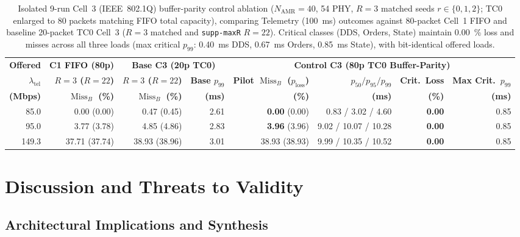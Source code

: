 \documentclass[11pt,a4paper]{article}
\newcommand{\Namr}{\ensuremath{N_{\mathrm{AMR}}}}
\newcommand{\ltel}{\ensuremath{\lambda_{\mathrm{tel}}}}
\newcommand{\MissB}{\ensuremath{\operatorname{Miss}_B}}
\newcommand{\ploss}{\ensuremath{p_{\mathrm{loss}}}}
\begin{document}
\begin{table}[!tbp]
\centering
\scriptsize
\setlength{\tabcolsep}{1.8pt}
\caption{Isolated 9-run Cell~3 (IEEE~802.1Q) buffer-parity control ablation ($\Namr=40$, \qty{54}{\mbps} PHY, $R=3$ matched seeds $r \in \{0,1,2\}$; TC0 enlarged to 80 packets matching FIFO total capacity), comparing Telemetry (\qty{100}{\milli\second}) outcomes against 80-packet Cell~1 FIFO and baseline 20-packet TC0 Cell~3 ($R=3$ matched and \texttt{supp-maxR} $R=22$). Critical classes (DDS, Orders, State) maintain \qty{0.00}{\percent} loss and misses across all three loads (max critical $p_{99}$: \qty{0.40}{\milli\second} DDS, \qty{0.67}{\milli\second} Orders, \qty{0.85}{\milli\second} State), with bit-identical offered loads.}
\label{tab:bufparity_pilot}
\begin{tabular}{@{}r r r r r r r r@{}}
\toprule
\textbf{Offered} & \textbf{C1 FIFO (80p)} & \multicolumn{2}{c}{\textbf{Base C3 (20p TC0)}} & \multicolumn{4}{c}{\textbf{Control C3 (80p TC0 Buffer-Parity)}} \\
\cmidrule(lr){3-4} \cmidrule(lr){5-8}
\textbf{$\ltel$} & \textbf{$R{=}3$ ($R{=}22$)} & \textbf{$R{=}3$ ($R{=}22$)} & \textbf{Base $p_{99}$} & \textbf{Pilot $\MissB$ ($\ploss$)} & \textbf{$p_{50}/p_{95}/p_{99}$} & \textbf{Crit.\ Loss} & \textbf{Max Crit.\ $p_{99}$} \\
\textbf{(Mbps)} & \textbf{$\MissB$ (\%)} & \textbf{$\MissB$ (\%)} & \textbf{(ms)} & \textbf{(\%)} & \textbf{(ms)} & \textbf{(\%)} & \textbf{(ms)} \\
\midrule
85.0 & 0.00 (0.00) & 0.47 (0.45) & 2.61 & \textbf{0.00} (0.00) & 0.83 / 3.02 / 4.60 & \textbf{0.00} & 0.85 \\
95.0 & 3.77 (3.78) & 4.85 (4.86) & 2.83 & \textbf{3.96} (3.96) & 9.02 / 10.07 / 10.28 & \textbf{0.00} & 0.85 \\
149.3 & 37.71 (37.74) & 38.93 (38.96) & 3.01 & 38.93 (38.93) & 9.99 / 10.35 / 10.52 & \textbf{0.00} & 0.85 \\
\bottomrule
\end{tabular}
\end{table}

\section{Discussion and Threats to Validity}
\label{sec:discussion}

\subsection{Architectural Implications and Synthesis}
\label{sec:hypothesis_verdict}
\end{document}
